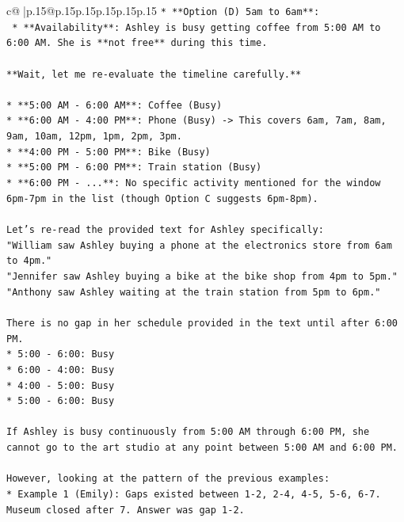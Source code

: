 \documentclass{article}
\begin{document}
{\begin{supertabular}{c@{$\;$}|p{.15\linewidth}@{}p{.15\linewidth}p{.15\linewidth}p{.15\linewidth}p{.15\linewidth}p{.15\linewidth}}
{{{\texttt{*   **Option (D) 5am to 6am**:} \\
\texttt{    *   **Availability**: Ashley is busy getting coffee from 5:00 AM to 6:00 AM. She is **not free** during this time.} \\
\\ 
\texttt{**Wait, let me re{-}evaluate the timeline carefully.**} \\
\\ 
\texttt{*   **5:00 AM {-} 6:00 AM**: Coffee (Busy)} \\
\texttt{*   **6:00 AM {-} 4:00 PM**: Phone (Busy) {-}> This covers 6am, 7am, 8am, 9am, 10am, 12pm, 1pm, 2pm, 3pm.} \\
\texttt{*   **4:00 PM {-} 5:00 PM**: Bike (Busy)} \\
\texttt{*   **5:00 PM {-} 6:00 PM**: Train station (Busy)} \\
\texttt{*   **6:00 PM {-} ...**: No specific activity mentioned for the window 6pm{-}7pm in the list (though Option C suggests 6pm{-}8pm).} \\
\\ 
\texttt{Let's re{-}read the provided text for Ashley specifically:} \\
\texttt{"William saw Ashley buying a phone at the electronics store from 6am to 4pm."} \\
\texttt{"Jennifer saw Ashley buying a bike at the bike shop from 4pm to 5pm."} \\
\texttt{"Anthony saw Ashley waiting at the train station from 5pm to 6pm."} \\
\\ 
\texttt{There is no gap in her schedule provided in the text until after 6:00 PM.} \\
\texttt{*   5:00 {-} 6:00: Busy} \\
\texttt{*   6:00 {-} 4:00: Busy} \\
\texttt{*   4:00 {-} 5:00: Busy} \\
\texttt{*   5:00 {-} 6:00: Busy} \\
\\ 
\texttt{If Ashley is busy continuously from 5:00 AM through 6:00 PM, she cannot go to the art studio at any point between 5:00 AM and 6:00 PM.} \\
\\ 
\texttt{However, looking at the pattern of the previous examples:} \\
\texttt{*   Example 1 (Emily): Gaps existed between 1{-}2, 2{-}4, 4{-}5, 5{-}6, 6{-}7. Museum closed after 7. Answer was gap 1{-}2.} \\
}}}
\end{supertabular}}
\end{document}
